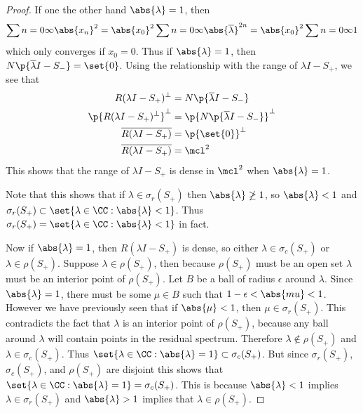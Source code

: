 \documentclass[11pt, oneside]{article}
\begin{document}
\begin{enumerate}
\begin{enumerate}
\begin{proof}
          If one the other hand $\abs{\lambda} = 1$, then
          \[
            \sum{n = 0}{\infty}{\abs{x_n}^2} = \abs{x_0}^2 \sum{n = 0}{\infty}{\abs{\overline{\lambda}}^{2n}}
            = \abs{x_0}^2 \sum{n = 0}{\infty}{1}
          \]
          which only converges if $x_0 = 0$.
          Thus if $\abs{\lambda} = 1$, then
          $N\p{\overline{\lambda}I - S_-} = \set{0}$.
          Using the relationship with the range of $\lambda I - S_+$, we see
          that
          \begin{align*}
            R(\lambda I - S_+)^{\perp} &= N\p{\overline{\lambda}I - S_-} \\
            \p{R(\lambda I - S_+)^{\perp}}^{\perp} &= \p{N\p{\overline{\lambda}I - S_-}}^{\perp} \\
            \overline{R(\lambda I - S_+)} &= \p{\set{0}}^{\perp} \\
            \overline{R(\lambda I - S_+)} &= \mcl^2 \\
          \end{align*}
          This shows that the range of $\lambda I - S_+$ is dense in $\mcl^2$ when
          $\abs{\lambda} = 1$.

          Note that this shows that if $\lambda \in \sigma_r(S_+)$ then
          $\abs{\lambda} \not\ge 1$, so $\abs{\lambda} < 1$ and
          $\sigma_r(S_+) \subset \set{\lambda \in \CC: \abs{\lambda} < 1}$.
          Thus $\sigma_r(S_+) = \set{\lambda \in \CC: \abs{\lambda} < 1}$ in fact.

          Now if $\abs{\lambda} = 1$, then $R(\lambda I - S_+)$ is dense, so
          either $\lambda \in \sigma_c(S_+)$ or $\lambda \in \rho(S_+)$.
          Suppose $\lambda \in \rho(S_+)$, then because $\rho(S_+)$ must be an
          open set $\lambda$ must be an interior point of $\rho(S_+)$.
          Let $B$ be a ball of radius $\epsilon$ around $\lambda$.
          Since $\abs{\lambda} = 1$, there must be some $\mu \in B$ such that
          $1 - \epsilon < \abs{mu} < 1$.
          However we have previously seen that if $\abs{\mu} < 1$, then
          $\mu \in \sigma_r(S_+)$.
          This contradicts the fact that $\lambda$ is an interior point of
          $\rho(S_+)$, because any ball around $\lambda$ will contain points
          in the residual spectrum.
          Therefore $\lambda \not\in \rho(S_+)$ and $\lambda \in \sigma_c(S_+)$.
          Thus $\set{\lambda \in \CC: \abs{\lambda} = 1} \subset \sigma_c(S_+)$.
          But since $\sigma_r(S_+)$, $\sigma_c(S_+)$, and $\rho(S_+)$ are
          disjoint this shows that
          $\set{\lambda \in \CC: \abs{\lambda} = 1} = \sigma_c(S_+)$.
          This is because $\abs{\lambda} < 1$ implies $\lambda \in \sigma_r(S_+)$
          and $\abs{\lambda} > 1$ implies that $\lambda \in \rho(S_+)$.


\end{proof}
\end{enumerate}
\end{enumerate}
\end{document}
